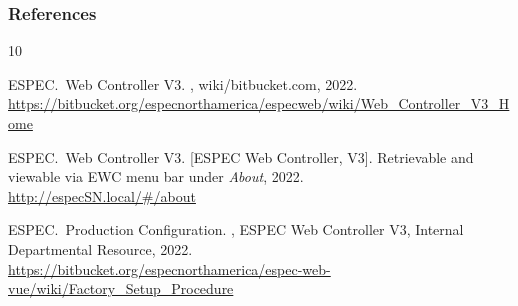 \documentclass{beamer}
\begin{document}
\begin{frame}[allowframebreaks]
  \frametitle<presentation>{References}
    
  \begin{thebibliography}{10}
    
  \beamertemplatebookbibitems

    ESPEC.~Web Controller V3.
    , wiki/bitbucket.com, 2022. \\
    {\url{https://bitbucket.org/especnorthamerica/especweb/wiki/Web_Controller_V3_Home}}

    ESPEC.~Web Controller V3.
     [ESPEC Web Controller, V3]. Retrievable and viewable
    via EWC menu bar under {\sl{About}}, 2022. \\
    {\url{http://especSN.local/\#/about}}

    ESPEC.~Production Configuration.
    , ESPEC Web Controller V3, Internal Departmental Resource, 2022. \\
    {\url{https://bitbucket.org/especnorthamerica/espec-web-vue/wiki/Factory_Setup_Procedure}}
  



  \end{thebibliography}
\end{frame}
\end{document}
